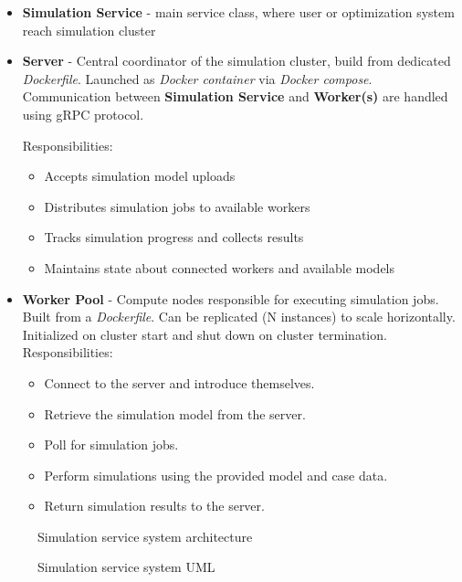 \begin{itemize}
	\item \textbf{Simulation Service} - main service class, where user or optimization system reach simulation cluster

	\item \textbf{Server} - Central coordinator of the simulation cluster, build from dedicated \textit{Dockerfile}. Launched as \textit{Docker container} via \textit{Docker compose}. Communication between \textbf{Simulation Service} and \textbf{Worker(s)} are handled using gRPC protocol.

	Responsibilities:
	\begin{itemize}
		\item Accepts simulation model uploads
		\item Distributes simulation jobs to available workers
		\item Tracks simulation progress and collects results
		\item Maintains state about connected workers and available models
	\end{itemize}

	\item \textbf{Worker Pool} - Compute nodes responsible for executing simulation jobs. Built from a \textit{Dockerfile}. Can be replicated (N instances) to scale horizontally. Initialized on cluster start and shut down on cluster termination.
		Responsibilities:
	\begin{itemize}
		\item Connect to the server and introduce themselves.
		\item Retrieve the simulation model from the server.
		\item Poll for simulation jobs.
		\item Perform simulations using the provided model and case data.
		\item Return simulation results to the server.
	\end{itemize}

\end{itemize}

\begin{figure}[H]
 	\centering
 	
 	\caption{Simulation service system architecture}
 	\label{fig:SimulationServiceSystemArchitecture}
 \end{figure}

\begin{figure}[H]
	\centering
	
	\caption{Simulation service system UML}
	\label{fig:SimulationServiceUML}
\end{figure}

